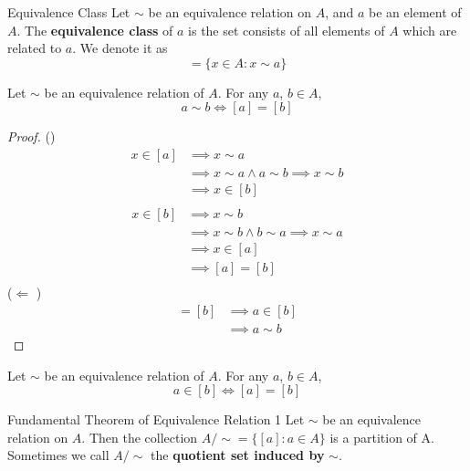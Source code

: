 \begin{definition}{Equivalence Class}{}
    Let $\sim$ be an equivalence relation on $A$, and $a$ be an element
    of $A$. The \textbf{equivalence class} of $a$ is the set consists
    of all elements of $A$ which are related to $a$. We denote it as
    \begin{equation*}
        [a] = \{x \in A: x \sim a\}
    \end{equation*}
\end{definition}

\begin{theorem}{}{}
    Let $\sim$ be an equivalence relation of $A$. For any $a$, $b \in A$,
    \begin{equation*}
        a \sim b \iff [a] = [b]
    \end{equation*}
\end{theorem}

\begin{proof}
    (\implies )
    \begin{align*}
        x \in [a] &\implies x \sim a\\
        &\implies x \sim a \land a \sim b \implies x \sim b\\
        &\implies x \in [b]\\
    \end{align*}
    \begin{align*}
        x \in [b] &\implies x \sim b\\
        &\implies x \sim b \land b \sim a \implies x \sim a\\
        &\implies x \in [a]\\
        &\implies [a] = [b]\\
    \end{align*}
    ($\Leftarrow $ )
    \begin{align*}
        [a] = [b] &\implies a \in [b]\\
        &\implies a \sim b
    \end{align*}
\end{proof}

\begin{corollary}{}{}
    Let $\sim$ be an equivalence relation of $A$. For any $a$, $b \in A$,
    \begin{equation*}
        a \in [b] \iff [a] = [b]
    \end{equation*}
\end{corollary}

\begin{theorem}{Fundamental Theorem of Equivalence Relation 1}{}
    Let $\sim$ be an equivalence relation on $A$. Then the collection
    $A/\sim = \{[a]: a \in A\} $ is a partition of A. Sometimes we call
    $A/\sim$ the \textbf{quotient set induced by} $\sim$.
\end{theorem}

